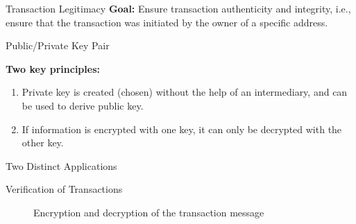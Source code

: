 \documentclass[]{beamer}
\begin{document}
\begin{frame}{Transaction Legitimacy}
\textbf{Goal:} Ensure transaction \textcolor{focus}{authenticity} and \textcolor{focus}{integrity}, i.e., ensure that the transaction was initiated by the owner of a specific address.
\uncover<2->{
		\center
		
		}
\uncover<3->{
		\vspace{1em}
		
	}
\end{frame}

\begin{frame}{Public/Private Key Pair}

	

\vspace{1em}

\textbf{Two key principles:}
\begin{enumerate}
\item<1-> Private key is created (chosen) without the help of an intermediary, and can be used to derive public key.
\item<2-> If information is encrypted with one key, it can only be decrypted with the other key.
\end{enumerate}

\vspace{1.5em}

\end{frame}

\begin{frame}{Two Distinct Applications}
	
\end{frame}


\begin{frame}{Verification of Transactions}
	\begin{figure}[h!]
		\center
		
		\caption*{Encryption and decryption of the transaction message}
		\label{fig:asymmeinfach}
	\end{figure}
	
\end{frame}
\end{document}
